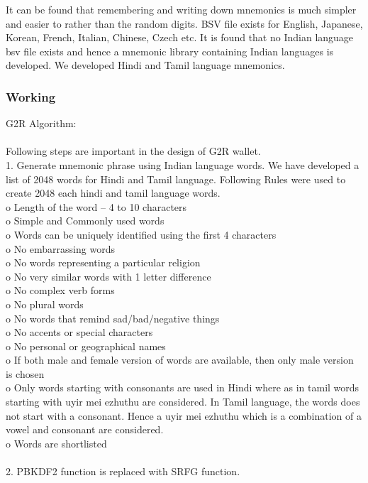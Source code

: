 \documentclass[12pt]{article}
\begin{document}
 It can be found that remembering and writing down
mnemonics is much simpler and easier to rather than the
random digits.
 BSV file exists for English, Japanese, Korean, French,
Italian, Chinese, Czech etc. It is found that no Indian
language bsv file exists and hence a mnemonic library
containing Indian languages is developed. We developed
Hindi and Tamil language mnemonics. 

\newpage
\subsubsection{Working}

G2R Algorithm:
\\
\\
Following steps are important in the design of G2R
wallet.
\\
1. Generate mnemonic phrase using Indian
language words. We have developed a list of
2048 words for Hindi and Tamil language.
Following Rules were used to create 2048 each
hindi and tamil language words.
\\o Length of the word – 4 to 10 characters
\\o Simple and Commonly used words
\\o Words can be uniquely identified using the first
4 characters
\\o No embarrassing words
\\o No words representing a particular religion
\\o No very similar words with 1 letter difference
\\o No complex verb forms
\\o No plural words
\\o No words that remind sad/bad/negative things
\\o No accents or special characters
\\o No personal or geographical names
\\o If both male and female version of words are
available, then only male version is chosen
\\o Only words starting with consonants are used
in Hindi where as in tamil words starting with
uyir mei ezhuthu are considered. In Tamil
language, the words does not start with a
consonant. Hence a uyir mei ezhuthu which is
a combination of a vowel and consonant are
considered.
\\o Words are shortlisted
\\
\\
2. PBKDF2 function is replaced with SRFG
function.
\end{document}
